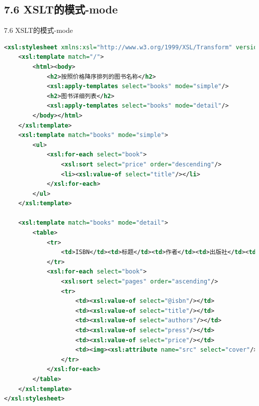 \subsection{7.6 XSLT的模式-mode}
\begin{frame}{7.6 XSLT的模式-mode}
\begin{lstlisting}[tabsize=8, basicstyle=\small\tt, language=XML, caption=样式文档]
<xsl:stylesheet xmlns:xsl="http://www.w3.org/1999/XSL/Transform" version="2.0">
    <xsl:template match="/">
        <html><body>
            <h2>按照价格降序排列的图书名称</h2>
            <xsl:apply-templates select="books" mode="simple"/>
            <h2>图书详细列表</h2>
            <xsl:apply-templates select="books" mode="detail"/>
        </body></html>
    </xsl:template>
    <xsl:template match="books" mode="simple">
        <ul>
            <xsl:for-each select="book">
                <xsl:sort select="price" order="descending"/>
                <li><xsl:value-of select="title"/></li>
            </xsl:for-each>
        </ul>
    </xsl:template>
    
    <xsl:template match="books" mode="detail">
        <table>
            <tr>
                <td>ISBN</td><td>标题</td><td>作者</td><td>出版社</td><td>价格</td>
            </tr>
            <xsl:for-each select="book">
                <xsl:sort select="pages" order="ascending"/>
                <tr>
                    <td><xsl:value-of select="@isbn"/></td>
                    <td><xsl:value-of select="title"/></td>
                    <td><xsl:value-of select="authors"/></td>
                    <td><xsl:value-of select="press"/></td>
                    <td><xsl:value-of select="price"/></td>
                    <td><img><xsl:attribute name="src" select="cover"/></img></td>
                </tr>
            </xsl:for-each>
        </table>
    </xsl:template>
</xsl:stylesheet>
\end{lstlisting}


\end{frame}
